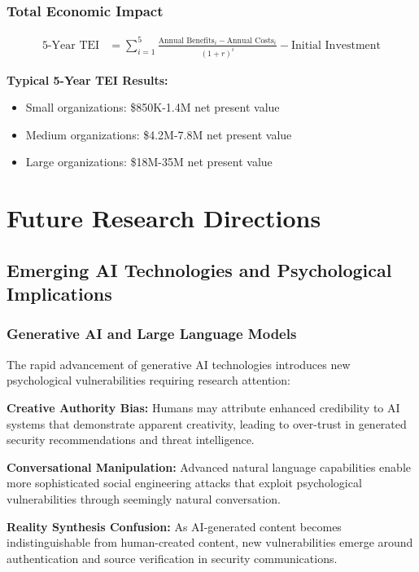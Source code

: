 \documentclass[11pt,a4paper]{article}
\begin{document}
\subsubsection{Total Economic Impact}

\begin{align}
\text{5-Year TEI} &= \sum_{i=1}^{5} \frac{\text{Annual Benefits}_i - \text{Annual Costs}_i}{(1 + r)^i} - \text{Initial Investment}
\end{align}

\textbf{Typical 5-Year TEI Results:}
\begin{itemize}
\item Small organizations: \$850K-1.4M net present value
\item Medium organizations: \$4.2M-7.8M net present value
\item Large organizations: \$18M-35M net present value
\end{itemize}

\section{Future Research Directions}

\subsection{Emerging AI Technologies and Psychological Implications}

\subsubsection{Generative AI and Large Language Models}

The rapid advancement of generative AI technologies introduces new psychological vulnerabilities requiring research attention:

\textbf{Creative Authority Bias:} Humans may attribute enhanced credibility to AI systems that demonstrate apparent creativity, leading to over-trust in generated security recommendations and threat intelligence.

\textbf{Conversational Manipulation:} Advanced natural language capabilities enable more sophisticated social engineering attacks that exploit psychological vulnerabilities through seemingly natural conversation.

\textbf{Reality Synthesis Confusion:} As AI-generated content becomes indistinguishable from human-created content, new vulnerabilities emerge around authentication and source verification in security communications.
\end{document}
